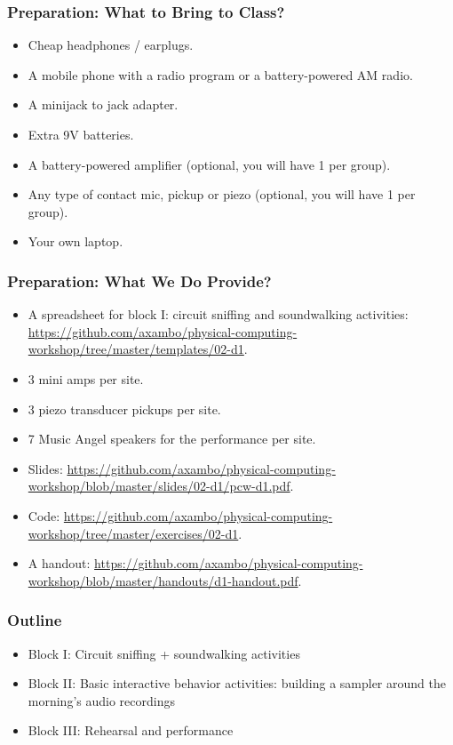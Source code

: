 \documentclass[screen, aspectratio=43]{beamer}
\begin{document}
%
\begin{frame}
  \frametitle{Preparation: What to Bring to Class?}
        \begin{itemize}
        \item Cheap headphones / earplugs.
        \item A mobile phone with a radio program or a battery-powered AM radio.
        \item A minijack to jack adapter.
        \item Extra 9V batteries.
        \item A battery-powered amplifier (optional, you will have 1 per group).
        \item Any type of contact mic, pickup or piezo (optional, you will have 1 per group).
        \item Your own laptop.
         \end{itemize}
\end{frame}
%
\begin{frame}
  \frametitle{Preparation: What We Do Provide?}
        \begin{itemize}
        \item A spreadsheet for block I: circuit sniffing and soundwalking activities: \url{https://github.com/axambo/physical-computing-workshop/tree/master/templates/02-d1}.
        \item 3 mini amps per site.
        \item 3 piezo transducer pickups per site.
        \item 7 Music Angel speakers for the performance per site.
        \item Slides: \url{https://github.com/axambo/physical-computing-workshop/blob/master/slides/02-d1/pcw-d1.pdf}.
        \item Code: \url{https://github.com/axambo/physical-computing-workshop/tree/master/exercises/02-d1}.
        \item A handout: \url{https://github.com/axambo/physical-computing-workshop/blob/master/handouts/d1-handout.pdf}.        
         \end{itemize}
\end{frame}
%
\begin{frame}
  \frametitle{Outline}
      \begin{itemize}
	\item Block I: Circuit sniffing + soundwalking activities
	\item Block II: Basic interactive behavior activities: building a sampler around the morning's audio recordings
	\item Block III: Rehearsal and performance
    \end{itemize}  
\end{frame}
\end{document}
